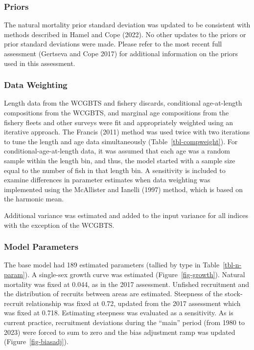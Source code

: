 \documentclass[
  english,
]{article}
\begin{document}
\subsubsection{Priors}\label{priors}

The natural mortality prior standard deviation was updated to be
consistent with methods described in Hamel and Cope (2022). No other
updates to the priors or prior standard deviations were made. Please
refer to the most recent full assessment (Gertseva and Cope 2017) for
additional information on the priors used in this assessment.

\subsubsection{Data Weighting}\label{data-weighting}

Length data from the WCGBTS and fishery discards, conditional
age-at-length compositions from the WCGBTS, and marginal age
compositions from the fishery fleets and other surveys were fit and
appropriately weighted using an iterative approach. The Francis (2011)
method was used twice with two iterations to tune the length and age
data simultaneously (Table~\ref{tbl-compweight}). For
conditional-age-at-length data, it was assumed that each age was a
random sample within the length bin, and thus, the model started with a
sample size equal to the number of fish in that length bin. A
sensitivity is included to examine differences in parameter estimates
when data weighting was implemented using the McAllister and Ianelli
(1997) method, which is based on the harmonic mean.

Additional variance was estimated and added to the input variance for
all indices with the exception of the WCGBTS.

\subsubsection{Model Parameters}\label{model-parameters}

The base model had 189 estimated parameters (tallied by type in
Table~\ref{tbl-n-param}). A single-sex growth curve was estimated
(Figure~\ref{fig-growth}). Natural mortality was fixed at 0.044, as in
the 2017 assessment. Unfished recruitment and the distribution of
recruits between areas are estimated. Steepness of the stock-recruit
relationship was fixed at 0.72, updated from the 2017 assessment which
was fixed at 0.718. Estimating steepness was evaluated as a sensitivity.
As is current practice, recruitment deviations during the ``main''
period (from 1980 to 2023) were forced to sum to zero and the bias
adjustment ramp was updated (Figure~\ref{fig-biasadj}).
\end{document}
